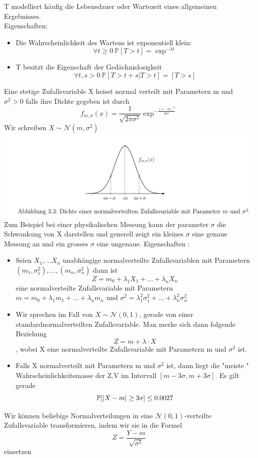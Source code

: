 T modelliert häufig die Lebensdauer oder Wartezeit eines allgemeinen Ergebnisses. \\
Eigenschaften: \begin{itemize}
    \item Die Wahrscheinlichkeit des Wartens ist exponentiell klein: \[ \forall t \geq 0 \ \mathbb{P}[T > t] = \exp^{-\lambda t }\]
    \item T besitzt die Eigenschaft der Gedächnislosigkeit \[ \forall t,s > 0 \ \mathbb{P}[T > t + s | T > t] = [T > s]\]
\end{itemize}

\Def[3.29] \newline
Eine stetige Zufallsvariable X heisst normal verteilt mit Parametern m und \( \sigma^2 > 0\) falls ihre Dichte gegeben ist durch \[ f_{m,\sigma}(x) = \frac{1}{\sqrt{2 \pi \sigma^2}}\exp^{-\frac{(x-m)^2}{2 \sigma^2}}\]
Wir schreiben \( X \sim \mathcal{N}(m, \sigma^2)\) \newline
\Bem[3.29A] \newline
\includegraphics[scale=0.175]{Dichte_Normalverteilung.png} \\
Zum Beispiel bei einer physikalischen Messung kann der parameter \( \sigma\) die Schwankung von X darstellen und generell zeigt ein kleines \(\sigma\) eine genaue Messung an und ein grosses \(\sigma\) eine ungenaue.
Eigenschaften : \begin{itemize}
    \item Seien \(X_1, \dots X_n\) unabhängige normalverteilte Zufallsvariablen mit Parametern \((m_1, \sigma_1^2), \dots , (m_n, \sigma_n^2)\) dann ist \[ Z = m_0 + \lambda_1 X_1 + \dots + \lambda_n X_n \] eine normalverteilte Zufallsvariable mit Parametern \(m = m_0 + \lambda_1 m_1 + \dots + \lambda_n m_n\) und \(\sigma^2 = \lambda_1^2 \sigma_1^2 + \dots + \lambda_n^2 \sigma_n^2\)
    \item Wir sprechen im Fall von  \( X \sim \mathcal{N}(0,1)\), gerade von einer standardnormalverteilten Zufallsvariable. Man merke sich dann folgende Beziehung \[ Z = m + \lambda \cdot X\], wobei X eine normalverteilte Zufallsvariable mit Parametern m und \(\sigma^2\) ist.
    \item Falls X normalverteilt mit Parametern m und \( \sigma^2 \) ist, dann liegt die "meiste " Wahrscheinlichkeitsmasse der Z.V im Intervall \( [m - 3\sigma, m + 3\sigma ]\). Es gilt gerade \[ \mathbb{P}[\left\lvert X - m \right\rvert \geq 3 \sigma ] \leq 0.0027\]
\end{itemize}
Wir können beliebige Normalverteilungen in eine \( \mathcal{N}(0,1)\)-verteilte Zufallsvariable transformieren, indem wir sie in die Formel
\[Z = \frac{Y - m}{\sqrt{\sigma^2}}\]
einsetzen \newline
